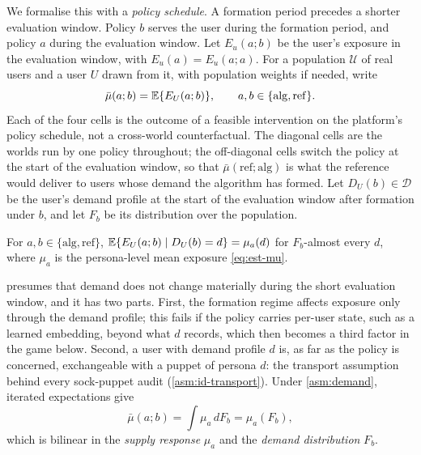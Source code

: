 We formalise this with a \emph{policy schedule}. A formation period precedes a shorter evaluation window. Policy $b$ serves the user during the formation period, and policy $a$ during the evaluation window. Let $E_u(a;b)$ be the user's exposure in the evaluation window, with $E_u(a)=E_u(a;a)$. For a population $\mathcal U$ of real users and a user $U$ drawn from it, with population weights if needed, write
\[
  \bar\mu(a;b)=\mathbb{E}\{E_U(a;b)\},\qquad a,b\in\{\mathrm{alg},\mathrm{ref}\}.
\]
Each of the four cells is the outcome of a feasible intervention on the platform's policy schedule, not a cross-world counterfactual. The diagonal cells are the worlds run by one policy throughout; the off-diagonal cells switch the policy at the start of the evaluation window, so that $\bar\mu(\mathrm{ref};\mathrm{alg})$ is what the reference would deliver to users whose demand the algorithm has formed. Let $D_U(b)\in\mathcal D$ be the user's demand profile at the start of the evaluation window after formation under $b$, and let $F_b$ be its distribution over the population.

\begin{assumption}\label{asm:demand}
For $a,b\in\{\mathrm{alg},\mathrm{ref}\}$, $\mathbb{E}\{E_U(a;b)\mid D_U(b)=d\}=\mu_a(d)$ for $F_b$-almost every $d$, where $\mu_a$ is the persona-level mean exposure \eqref{eq:est-mu}.
\end{assumption}

 presumes that demand does not change materially during the short evaluation window, and it has two parts. First, the formation regime affects exposure only through the demand profile; this fails if the policy carries per-user state, such as a learned embedding, beyond what $d$ records, which then becomes a third factor in the game below. Second, a user with demand profile $d$ is, as far as the policy is concerned, exchangeable with a puppet of persona $d$: the transport assumption behind every sock-puppet audit (\cref{asm:id-transport}). Under \cref{asm:demand}, iterated expectations give
\begin{equation}\label{eq:est-bilinear}
  \bar\mu(a;b)=\int\mu_a\,dF_b=\mu_a(F_b),
\end{equation}
which is bilinear in the \emph{supply response} $\mu_a$ and the \emph{demand distribution} $F_b$.

